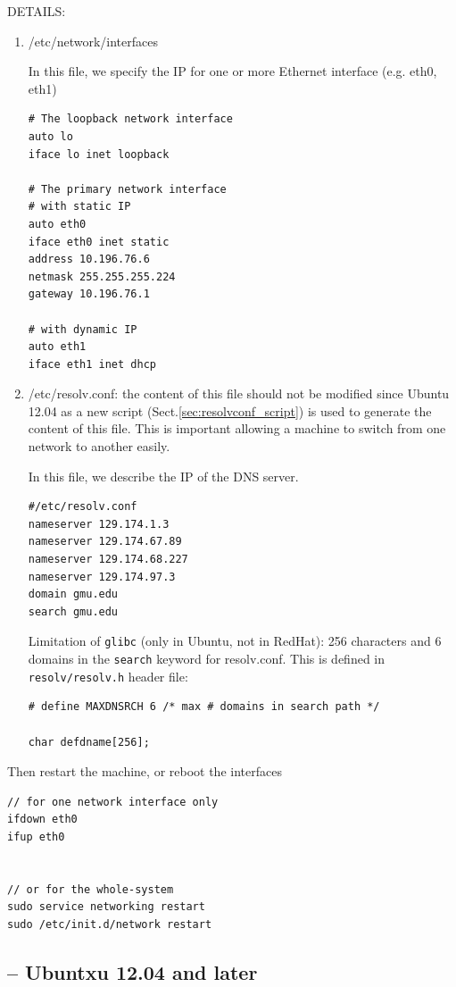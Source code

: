 DETAILS:
\begin{enumerate}
\item /etc/network/interfaces

In this file, we specify the IP for one or more Ethernet interface (e.g. eth0,
eth1)
\begin{verbatim}
# The loopback network interface
auto lo
iface lo inet loopback

# The primary network interface
# with static IP
auto eth0
iface eth0 inet static
address 10.196.76.6
netmask 255.255.255.224
gateway 10.196.76.1

# with dynamic IP
auto eth1
iface eth1 inet dhcp
\end{verbatim}


  \item /etc/resolv.conf: the content of this file should not be modified since
  Ubuntu 12.04 as a new script (Sect.\ref{sec:resolvconf_script}) is used to
  generate the content of this file. This is important allowing a machine to
  switch from one network to another easily.

In this file, we describe the IP of the DNS server.
\begin{verbatim}
#/etc/resolv.conf
nameserver 129.174.1.3                                                                                                                                                                                          
nameserver 129.174.67.89
nameserver 129.174.68.227
nameserver 129.174.97.3
domain gmu.edu
search gmu.edu
\end{verbatim}
Limitation of \verb!glibc! (only in Ubuntu, not in RedHat): 256 characters and 6
domains in the \verb!search! keyword for resolv.conf. This is defined in
\verb!resolv/resolv.h! header file:
\begin{verbatim}
# define MAXDNSRCH 6 /* max # domains in search path */

char defdname[256];
\end{verbatim}

\end{enumerate}

Then restart the machine, or reboot the interfaces
\begin{verbatim}
// for one network interface only
ifdown eth0
ifup eth0


// or for the whole-system
sudo service networking restart
sudo /etc/init.d/network restart
\end{verbatim}

\subsection{-- Ubuntxu 12.04 and later}
\label{sec:IP_static-Ubuntu-12.04+}
\label{sec:static_IP_resolvconf}

